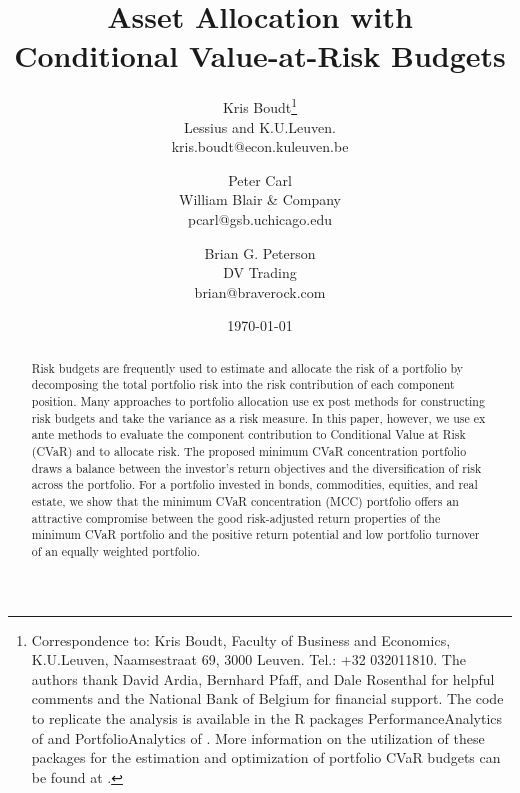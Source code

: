 \documentclass[12pt,a4paper]{article}
\renewcommand{\baselinestretch}{1.3}
\begin{document}
\vspace{-2cm}
\renewcommand{\baselinestretch}{1}
\title{Asset Allocation with \\ Conditional Value-at-Risk Budgets}

\smallskip

\author{
Kris Boudt\thanks{Correspondence to: Kris Boudt,
Faculty of Business and Economics, K.U.Leuven, Naamsestraat 69, 3000 Leuven. Tel.: +32 032011810. The authors thank David Ardia, Bernhard Pfaff, and Dale Rosenthal for helpful comments and the National Bank of Belgium for financial support. The code to replicate the analysis is available in the R packages PerformanceAnalytics of \citet{PerformanceAnalytics} and PortfolioAnalytics of \citet{PortfolioAnalytics}. More information on the utilization of these packages for the estimation and optimization of portfolio CVaR budgets can be found at \web.}\\
Lessius and K.U.Leuven.\\
kris.boudt@econ.kuleuven.be
 \and Peter Carl\\
William Blair \& Company  \\
pcarl@gsb.uchicago.edu\\
\and Brian G. Peterson\\
DV Trading\\
brian@braverock.com}

\date{\today}

\maketitle
\thispagestyle{empty} %

\vspace{-0.5cm}

\renewcommand{\baselinestretch}{1}
\begin{abstract}
Risk budgets are frequently used to estimate and allocate the risk of a portfolio by decomposing the total portfolio risk into the risk contribution of each component position. Many approaches to portfolio allocation use ex post methods for constructing risk budgets and take the variance as a risk measure. In this paper, however, we use ex ante methods to evaluate the component contribution to Conditional Value at Risk (CVaR) and to allocate risk. The proposed minimum CVaR concentration portfolio draws a balance between the investor's return objectives and the diversification of risk across the portfolio. For a portfolio invested in bonds, commodities, equities, and real estate, we show that the minimum CVaR concentration (MCC) portfolio offers an attractive compromise between the good risk-adjusted return properties of the minimum CVaR portfolio and the positive return potential and low portfolio turnover of an equally weighted portfolio.
\end{abstract}
\end{document}
